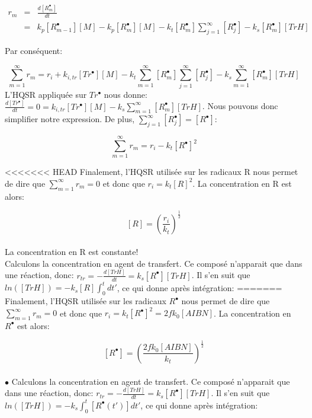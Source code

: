 \documentclass[a4paper,oneside,12pt]{article}
\begin{document}
\begin{eqnarray*}
r_{m} &=& \frac{d[R_{m}^{\bullet}]}{dt}\\
      &=& k_p[R_{m-1}^{\bullet}][M]-k_p[R_{m}^{\bullet}][M]-k_{t}[R_m^{\bullet}]\sum\limits_{j=1}^\infty[R_j^{\bullet}]-k_{s}[R_{m}^{\bullet}][TrH]
\end{eqnarray*}

Par conséquent:

\begin{equation}
\sum\limits_{m=1}^\infty r_{m}=r_i+ k_{i,tr}[Tr^{\bullet}][M] -k_{t}\sum\limits_{m=1}^\infty [R_m^{\bullet}] \sum\limits_{j=1}^\infty[R_j^{\bullet}]-k_{s}\sum\limits_{m=1}^\infty[R_{m}^{\bullet}][TrH]
\end{equation}
L'HQSR appliquée sur $Tr^{\bullet}$ nous donne: $\frac{d[Tr^{\bullet}]}{dt}=0=k_{i,tr}[Tr^{\bullet}][M]-k_{s}\sum\limits_{m=1}^\infty[R_{m}^{\bullet}][TrH]$. Nous pouvons donc simplifier notre expression. De plus, $\sum\limits_{j=1}^\infty[R_j^{\bullet}] = [R^{\bullet}]$:

\begin{equation}
\sum\limits_{m=1}^\infty r_{m}=r_i-k_{t}[R^{\bullet}]^2
\end{equation}

<<<<<<< HEAD
Finalement, l'HQSR utilisée sur les radicaux R nous permet de dire que $\sum\limits_{m=1}^\infty r_{m}=0$ et donc que $r_i=k_{t}[R]^2$. La concentration en R est alors:

$$[R]=(\frac{r_i}{k_t})^{\frac{1}{2}}$$\\

La concentration en R est constante!\\

 Calculons la concentration en agent de transfert. Ce composé n'apparait que dans une réaction, donc: $r_{tr}=-\frac{d[TrH]}{dt}=k_s[R^{\bullet}][TrH]$. Il s'en suit que $ln([TrH])=-k_s[R]\int_{0}^t dt'$, ce qui donne après intégration:
=======
Finalement, l'HQSR utilisée sur les radicaux $R^{\bullet}$ nous permet de dire que $\sum\limits_{m=1}^\infty r_{m}=0$ et donc que $r_i=k_{t}[R^{\bullet}]^2=2fk_{0}[AIBN]$. La concentration en $R^{\bullet}$ est alors:

$$[R^{\bullet}]=(\frac{2fk_{0}[AIBN]}{k_t})^{\frac{1}{2}}$$\\

$\bullet$ Calculons la concentration en agent de transfert. Ce composé n'apparait que dans une réaction, donc: $r_{tr}=-\frac{d[TrH]}{dt}=k_s[R^{\bullet}][TrH]$. Il s'en suit que $ln([TrH])=-k_s\int_{0}^t [R^{\bullet}(t')]dt'$, ce qui donne après intégration:
\end{document}
